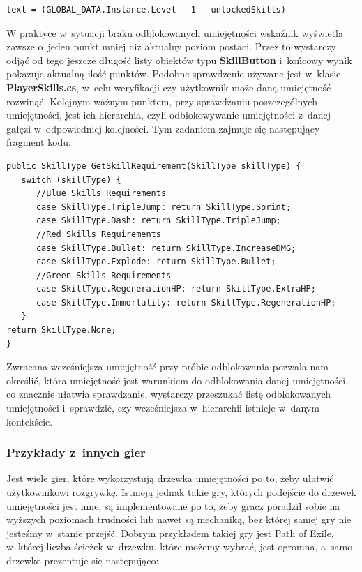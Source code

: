 \documentclass[oneside,polski,logo]{amuthesis}
\begin{document}
\begin{lstlisting}[breaklines=true,
language={[Sharp]C},
rulecolor=\color{blue!80!black},
caption={Fragment klasy \texttt{UI\_SkillTree.cs}}
]    
text = (GLOBAL_DATA.Instance.Level - 1 - unlockedSkills)
\end{lstlisting}

W praktyce w~sytuacji braku odblokowanych umiejętności wskaźnik wyświetla zawsze o~jeden punkt mniej niż aktualny poziom postaci. Przez to wystarczy odjąć od tego jeszcze długość listy obiektów typu \textbf{SkillButton} i~końcowy wynik pokazuje aktualną ilość punktów. Podobne sprawdzenie używane jest w~klasie \textbf{PlayerSkills.cs}, w~celu weryfikacji czy użytkownik może daną umiejętność rozwinąć. Kolejnym ważnym punktem, przy sprawdzaniu poszczególnych umiejętności, jest ich hierarchia, czyli odblokowywanie umiejętności z~danej gałęzi w~odpowiedniej kolejności. Tym zadaniem zajmuje się następujący fragment kodu:

\newpage
\begin{lstlisting}[breaklines=true,
language={[Sharp]C},
rulecolor=\color{blue!80!black},
caption={Fragment klasy \texttt{PlayerSkills.cs}}
]    
public SkillType GetSkillRequirement(SkillType skillType) {
   switch (skillType) {
      //Blue Skills Requirements
      case SkillType.TripleJump: return SkillType.Sprint;
      case SkillType.Dash: return SkillType.TripleJump;
      //Red Skills Requirements
      case SkillType.Bullet: return SkillType.IncreaseDMG;
      case SkillType.Explode: return SkillType.Bullet;
      //Green Skills Requirements
      case SkillType.RegenerationHP: return SkillType.ExtraHP;
      case SkillType.Immortality: return SkillType.RegenerationHP;
   }
return SkillType.None;
}
\end{lstlisting}

Zwracana wcześniejsza umiejętność przy próbie odblokowania pozwala nam określić, która umiejętność jest warunkiem do odblokowania danej umiejętności, co znacznie ułatwia sprawdzanie, wystarczy przeszukać listę odblokowanych umiejętności i~sprawdzić, czy wcześniejsza w~hierarchii istnieje w~danym kontekście.

\subsubsection{Przykłady z~innych gier}
Jest wiele gier, które wykorzystują drzewka umiejętności po to, żeby ułatwić użytkownikowi rozgrywkę. Istnieją jednak takie gry, których podejście do drzewek umiejętności jest inne, są implementowane po to, żeby gracz poradził sobie na wyższych poziomach trudności lub nawet są mechaniką, bez której samej gry nie jesteśmy w~stanie przejść. Dobrym przykładem takiej gry jest Path of Exile, w~której liczba ścieżek w~drzewku, które możemy wybrać, jest ogromna, a~samo drzewko prezentuje się następująco:
\end{document}
